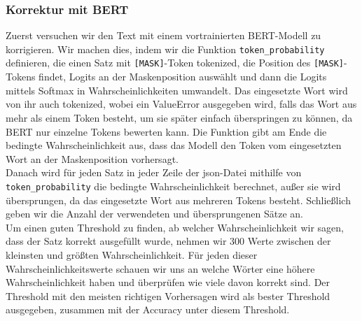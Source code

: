 \documentclass[a4paper, 11pt]{article}          %
\begin{document}
\subsubsection{Korrektur mit BERT}
Zuerst versuchen wir den Text mit einem vortrainierten BERT-Modell zu korrigieren. Wir machen dies, indem wir die Funktion \texttt{token\_probability} definieren, die einen Satz mit \texttt{[MASK]}-Token tokenized, die Position des \texttt{[MASK]}-Tokens findet, Logits an der Maskenposition auswählt und dann die Logits mittels Softmax in Wahrscheinlichkeiten umwandelt. Das eingesetzte Wort wird von ihr auch tokenized, wobei ein ValueError ausgegeben wird, falls das Wort aus mehr als einem Token besteht, um sie später einfach überspringen zu können, da BERT nur einzelne Tokens bewerten kann. Die Funktion gibt am Ende die bedingte Wahrscheinlichkeit aus, dass das Modell den Token vom eingesetzten Wort an der Maskenposition vorhersagt.
\\
Danach wird für jeden Satz in jeder Zeile der json-Datei mithilfe von \texttt{token\_probability} die bedingte Wahrscheinlichkeit berechnet, außer sie wird übersprungen, da das eingesetzte Wort aus mehreren Tokens besteht. Schließlich geben wir die Anzahl der verwendeten und übersprungenen Sätze an.
\\
Um einen guten Threshold zu finden, ab welcher Wahrscheinlichkeit wir sagen, dass der Satz korrekt ausgefüllt wurde, nehmen wir 300 Werte zwischen der kleinsten und größten Wahrscheinlichkeit. Für jeden dieser Wahrscheinlichkeitswerte schauen wir uns an welche Wörter eine höhere Wahrscheinlichkeit haben und überprüfen wie viele davon korrekt sind. Der Threshold mit den meisten richtigen Vorhersagen wird als bester Threshold ausgegeben, zusammen mit der Accuracy unter diesem Threshold.
\end{document}
